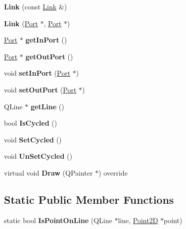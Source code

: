 \begin{DoxyCompactItemize}
\item 
\mbox{\label{classLink_a2db8894bce4b94c941fe973f46d63600}} 
{\bfseries Link} (const \hyperlink{classLink}{Link} \&)
\item 
\mbox{\label{classLink_a4d958d9cfbb214cd244f997958c5f1ad}} 
{\bfseries Link} (\hyperlink{classPort}{Port} $\ast$, \hyperlink{classPort}{Port} $\ast$)
\item 
\mbox{\label{classLink_abd0c01cc4f2327c0ae4fd8ab6af07653}} 
\hyperlink{classPort}{Port} $\ast$ {\bfseries get\+In\+Port} ()
\item 
\mbox{\label{classLink_a6b574d3c11ee9bba28509e5d85acaa94}} 
\hyperlink{classPort}{Port} $\ast$ {\bfseries get\+Out\+Port} ()
\item 
\mbox{\label{classLink_a2689e0202d4a1d1b39588abd25241417}} 
void {\bfseries set\+In\+Port} (\hyperlink{classPort}{Port} $\ast$)
\item 
\mbox{\label{classLink_aa04660e88b32ea60c0209482a6bc68c1}} 
void {\bfseries set\+Out\+Port} (\hyperlink{classPort}{Port} $\ast$)
\item 
\mbox{\label{classLink_a83ac4b54c4b0a240701821c2c195364e}} 
Q\+Line $\ast$ {\bfseries get\+Line} ()
\item 
\mbox{\label{classLink_a0e08eb4518bc88e7b74e6581badd91fd}} 
bool {\bfseries Is\+Cycled} ()
\item 
\mbox{\label{classLink_ac9f06bd0dd2272222b62102a94cf6607}} 
void {\bfseries Set\+Cycled} ()
\item 
\mbox{\label{classLink_a41ec810a02d72f2aa6e2c049075dd026}} 
void {\bfseries Un\+Set\+Cycled} ()
\item 
\mbox{\label{classLink_ab150ec2cc71a241be7e3abd40837f369}} 
virtual void {\bfseries Draw} (Q\+Painter $\ast$) override
\end{DoxyCompactItemize}
\subsection*{Static Public Member Functions}
\begin{DoxyCompactItemize}
\item 
\mbox{\label{classLink_a2b815f1d35a5588416190e7ea0a11b63}} 
static bool {\bfseries Is\+Point\+On\+Line} (Q\+Line $\ast$line, \hyperlink{classPoint2D}{Point2D} $\ast$point)
\end{DoxyCompactItemize}
